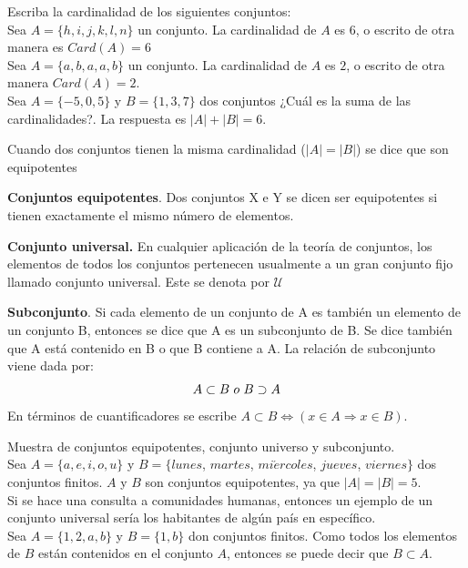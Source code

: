\begin{myexample}
Escriba la cardinalidad de los siguientes conjuntos:\\

\noindent Sea $A=\{h,i,j,k,l,n\}$ un conjunto. La cardinalidad de $A$ es $6$, o escrito de otra manera es $Card(A)=6$\\

\noindent Sea $A=\{a,b,a,a,b\}$ un conjunto. La cardinalidad de $A$ es $2$, o escrito de otra manera $Card(A)=2$.\\

\noindent Sea $A=\{-5,0,5\}$ y $B=\{1,3,7\}$ dos conjuntos ¿Cuál es la suma de las cardinalidades?. La respuesta es $|A|+|B|=6$.
\end{myexample}

Cuando dos conjuntos tienen la misma cardinalidad ($|A|=|B|$) se dice que son equipotentes
\begin{mydef}
\textbf{Conjuntos equipotentes}. Dos conjuntos X e Y se dicen ser equipotentes si tienen exactamente el mismo número de elementos.
\end{mydef}

\begin{mydef}\label{conjuntoU}
\textbf{Conjunto universal. }En cualquier aplicación de la teoría de conjuntos, los elementos de todos los conjuntos pertenecen usualmente a un gran conjunto fijo llamado conjunto universal. Este se denota por $\mathcal{U}$
\end{mydef}

\begin{mydef}
\textbf{Subconjunto}. Si cada elemento de un conjunto de A es también un elemento de un conjunto B, entonces se dice que A es un subconjunto de B. Se dice también que A está contenido en B o que B contiene a A. La relación de subconjunto viene dada por:\\
\begin{equation*}
A\subset B \hspace{3px} o \hspace{3px} B\supset A
\end{equation*} 
En términos de cuantificadores se escribe $A\subset B\Leftrightarrow (x\in A\Rightarrow x\in B)$.
\end{mydef}

\begin{myexample}
Muestra de conjuntos equipotentes, conjunto universo y subconjunto.\\

\noindent Sea $A=\{a,e,i,o,u\}$ y $B=\{lunes$, $martes$, $mi\acute{e}rcoles$, $jueves$, $viernes\}$ dos conjuntos finitos. $A$ y $B$ son conjuntos equipotentes, ya que $|A|=|B|=5$.\\

\noindent Si se hace una consulta a comunidades humanas, entonces un ejemplo de un conjunto universal sería los habitantes de algún país en específico.\\

\noindent Sea $A=\{1,2,a,b\}$ y $B=\{1,b\}$ don conjuntos finitos. Como todos los elementos de $B$ están contenidos en el conjunto $A$, entonces se puede decir que $B\subset A$.
\end{myexample}


